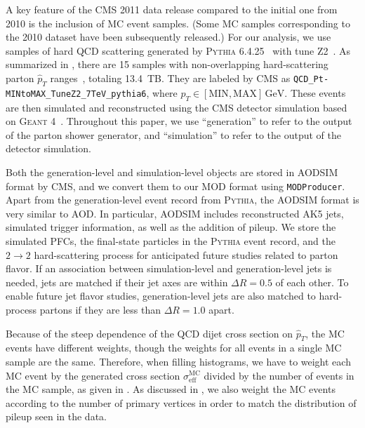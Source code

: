 \documentclass[aps,prd,twocolumn,preprintnumbers,nofootinbib,longbibliography,floatfix,superscriptaddress]{revtex4-1}
\begin{document}
A key feature of the CMS 2011 data release compared to the initial one from 2010 is the inclusion of MC event samples.
%
(Some MC samples corresponding to the 2010 dataset have been subsequently released.)
%
For our analysis, we use samples of hard QCD scattering generated by \textsc{Pythia} 6.4.25~\cite{Sjostrand:2006za} with tune Z2~\cite{Field:2011iq}.
%
As summarized in , there are 15 samples with non-overlapping hard-scattering parton $\hat{p}_T$ ranges~\cite{CMS:QCDsim0-5,CMS:QCDsim5-15,CMS:QCDsim15-30,CMS:QCDsim30-50,CMS:QCDsim50-80,CMS:QCDsim80-120,CMS:QCDsim120-170,CMS:QCDsim170-300,CMS:QCDsim300-470,CMS:QCDsim470-600,CMS:QCDsim600-800,CMS:QCDsim800-1000,CMS:QCDsim1000-1400,CMS:QCDsim1400-1800,CMS:QCDsim1800}, totaling \SI{13.4}{TB}.
%
They are labeled by CMS as \texttt{QCD\_Pt-MINtoMAX\_TuneZ2\_7TeV\_pythia6}, where $\hat{p}_T \in [\text{MIN},\text{MAX}]\,\text{GeV}$.
%
These events are then simulated and reconstructed using the CMS detector simulation based on \textsc{Geant 4}~\cite{Agostinelli:2002hh}.
%
Throughout this paper, we use ``generation'' to refer to the output of the parton shower generator, and ``simulation'' to refer to the output of the detector simulation.


Both the generation-level and simulation-level objects are stored in AODSIM format by CMS, and we convert them to our MOD format using \texttt{MODProducer}.
%
Apart from the generation-level event record from \textsc{Pythia}, the AODSIM format is very similar to AOD.
%
In particular, AODSIM includes reconstructed AK5 jets, simulated trigger information, as well as the addition of pileup.
%
We store the simulated PFCs, the final-state particles in the \textsc{Pythia} event record, and the $2 \to 2$ hard-scattering process for anticipated future studies related to parton flavor.
%
If an association between simulation-level and generation-level jets is needed, jets are matched if their jet axes are within $\Delta R=0.5$ of each other.
%
To enable future jet flavor studies, generation-level jets are also matched to hard-process partons if they are less than $\Delta R=1.0$ apart.


Because of the steep dependence of the QCD dijet cross section on $\hat{p}_T$, the MC events have different weights, though the weights for all events in a single MC sample are the same.
%
Therefore, when filling histograms, we have to weight each MC event by the generated cross section $\sigma_\text{eff}^\text{MC}$ divided by the number of events in the MC sample, as given in .
%
As discussed in , we also weight the MC events according to the number of primary vertices in order to match the distribution of pileup seen in the data.
\end{document}
